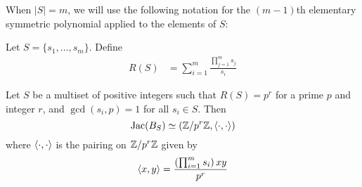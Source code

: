 \documentclass{amsart}
\begin{document}
When $|S| = m$, we will use the following notation for the $(m-1)$th
elementary symmetric polynomial applied to the elements of $S$:

\begin{defn}
  Let $S = \{s_1, \ldots, s_m\}$. Define
  \begin{align*}
    R(S) &= \sum_{i=1}^m\frac{\prod_{j=1}^ms_j}{s_i}
  \end{align*}
\end{defn}

\begin{prop}
  \label{prop:banana_pairing}
  Let $S$ be a multiset of positive integers such that $R(S) = p^r$
  for a prime $p$ and integer $r$, and $\gcd(s_i, p) = 1$ for all $s_i
  \in S$. Then
  \begin{equation*}
    \operatorname{Jac}(B_S) \simeq (\mathbb{Z}/p^r\mathbb{Z}, \langle \cdot, \cdot \rangle)
  \end{equation*}
  where $\langle \cdot, \cdot \rangle$ is the pairing on $\mathbb{Z}/p^r\mathbb{Z}$ given by
  \begin{equation*}
    \langle x, y \rangle = \frac{\left(\prod_{i=1}^ms_i\right)xy}{p^r}
  \end{equation*}
\end{prop}
\end{document}
